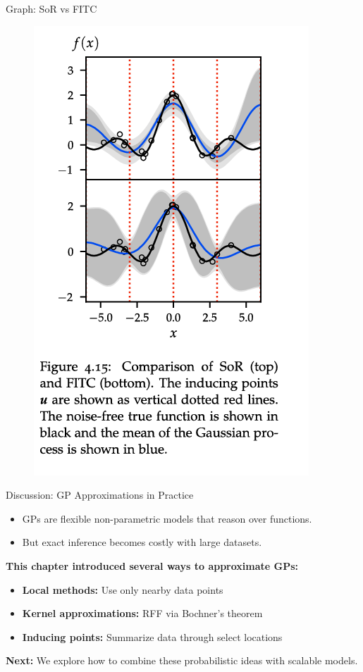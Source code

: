 \documentclass[handout,aspectratio=169]{beamer}
\begin{document}
\begin{frame}{Graph: SoR vs FITC}
\begin{figure}
    \centering
    \includegraphics[width=0.3\linewidth]{chapter_figs/04_figs/sor_fitc.png}
\end{figure}

    
\end{frame}

\begin{frame}{Discussion: GP Approximations in Practice}
\begin{itemize}
    \item GPs are flexible non-parametric models that reason over functions.
    \item But exact inference becomes costly with large datasets.
\end{itemize}

\vspace{0.3cm}
\textbf{This chapter introduced several ways to approximate GPs:}
\begin{itemize}
    \item \textbf{Local methods:} Use only nearby data points
    \item \textbf{Kernel approximations:} RFF via Bochner’s theorem
    \item \textbf{Inducing points:} Summarize data through select locations
\end{itemize}

\vspace{0.2cm}
\textbf{Next:} We explore how to combine these probabilistic ideas with scalable models.
\end{frame}














{
	\begin{frame}
	\end{frame}}
\end{document}
